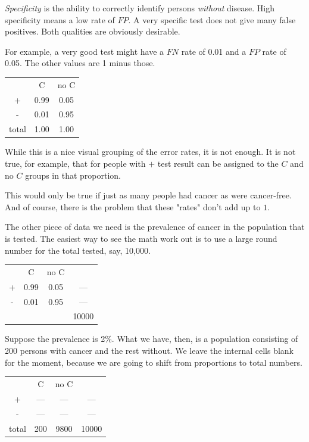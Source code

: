 \documentclass[11pt, oneside]{article}
\begin{document}
\emph{Specificity} is the ability to correctly identify persons \emph{without} disease.  High specificity means a low rate of $FP$.  A very specific test does not give many false positives.  Both qualities are obviously desirable.

For example, a very good test might have a $FN$ rate of 0.01 and a $FP$ rate of 0.05.  The other values are 1 minus those.
\begin{center}
\begin{tabular}{ |c|c|c| } 
 \hline
   & C & no C \\ 
 + & 0.99 & 0.05  \\ 
 - & 0.01 & 0.95  \\  
  total & 1.00 & 1.00  \\ 
 \hline
\end{tabular}
\end{center}

While this is a nice visual grouping of the error rates, it is not enough.  It is not true, for example, that for people with $+$ test result can be assigned to the $C$ and no $C$ groups in that proportion.  

This would only be true if just as many people had cancer as were cancer-free.  And of course, there is the problem that these "rates" don't add up to $1$.

The other piece of data we need is the prevalence of cancer in the population that is tested.  The easiest way to see the math work out is to use a large round number for the total tested, say, 10,000.
\begin{center}
\begin{tabular}{ |c|c|c|c| } 
 \hline
   & C & no C &  \\ 
 + & 0.99 & 0.05 & --- \\ 
 - & 0.01 & 0.95 & --- \\ 
 &  &  & 10000 \\ 
 \hline
\end{tabular}
\end{center}
Suppose the prevalence is 2\%.  What we have, then, is a population consisting of 200 persons with cancer and the rest without.  We leave the internal cells blank for the moment, because we are going to shift from proportions to total numbers.
\begin{center}
\begin{tabular}{ |c|c|c|c| } 
 \hline
   & C & no C &  \\ 
 + & --- & --- & --- \\ 
 - & --- & --- & --- \\ 
 total & 200 & 9800 & 10000 \\ 
 \hline
\end{tabular}
\end{center}
\end{document}
